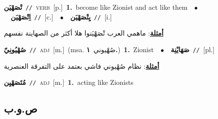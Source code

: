 \documentclass[10pt,a4paper,twoside]{article} %
\begin{document}
\begin{multicols}{2}
{\setlength\topsep{0pt}\textbf{\foreignlanguage{arabic}{تْصَهْيَن}}\ {\color{gray}\texttt{//}\color{black}}\ \textsc{verb}\ [p.]\ \textbf{1.}~become like Zionist and act like them\ \ $\bullet$\ \ \setlength\topsep{0pt}\textbf{\foreignlanguage{arabic}{اِتْصَهْيَن}}\ {\color{gray}\texttt{//}\color{black}}\ [c.]\ \ $\bullet$\ \ \setlength\topsep{0pt}\textbf{\foreignlanguage{arabic}{يِتْصَهْيَن}}\ {\color{gray}\texttt{//}\color{black}}\ [i.]\  \begin{flushright}\color{gray}\foreignlanguage{arabic}{\textbf{\underline{\foreignlanguage{arabic}{أمثلة}}}: ماهمي العرب تْصَهْيَنوا هلا أكثر من الصهاينة نفسهم}\end{flushright}\color{black}} \vspace{2mm}

{\setlength\topsep{0pt}\textbf{\foreignlanguage{arabic}{صُهْيُونِيّ}}\ {\color{gray}\texttt{//}\color{black}}\ \textsc{adj}\ [m.]\ \color{gray}(msa. \foreignlanguage{arabic}{صُهْيوني}~\foreignlanguage{arabic}{\textbf{١.}})\color{black}\ \textbf{1.}~Zionist\ \ $\bullet$\ \ \setlength\topsep{0pt}\textbf{\foreignlanguage{arabic}{صَهَايْنِة}}\ {\color{gray}\texttt{//}\color{black}}\ [pl.]\  \begin{flushright}\color{gray}\foreignlanguage{arabic}{\textbf{\underline{\foreignlanguage{arabic}{أمثلة}}}: نظام صُهْيوني فاشي بعتمد على التفرقة العنصرية}\end{flushright}\color{black}} \vspace{2mm}

{\setlength\topsep{0pt}\textbf{\foreignlanguage{arabic}{مُتَصَهْيِن}}\ {\color{gray}\texttt{//}\color{black}}\ \textsc{adj}\ [m.]\ \textbf{1.}~acting like Zionists\ } \vspace{2mm}

\vspace{-3mm}
\subsection*{\color{blue}\foreignlanguage{arabic}{ص.و.ب}\color{blue}{}} 


\end{multicols}
\end{document}
